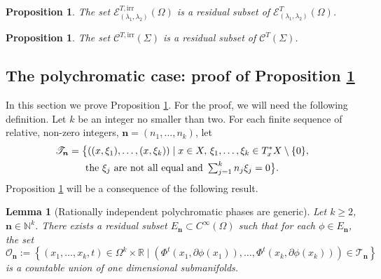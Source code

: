 \documentclass[JEP,XML,SOM,Unicode,published]{cedram}
\let\mathcal\mathscr
\let\sep\mid
\newcommand{\irr}{\mathrm{irr}}
\theoremstyle{plain}
\newtheorem{lemma}[theorem]{Lemma}
\newtheorem{proposition}[theorem]{Proposition}
\theoremstyle{definition}
\newcommand{\N}{\mathbb{N}}
\newcommand{\R}{\mathbb{R}}
\def\calT{\mathcal{T}}
\begin{document}
\begin{proposition}\label{prop:polychrom_conclusion}
The set $\mathcal{E}^{T,\irr}_{(\lambda_1,\lambda_2)}(\Omega)$ is a residual subset of $\mathcal{E}^{T}_{(\lambda_1,\lambda_2)}(\Omega)$.
\end{proposition}

\begin{proposition}\label{prop:monochrom_conclusion}
The set $\mathcal{C}^{T,\irr}(\Sigma)$ is a residual subset of $\mathcal{C}^{T}(\Sigma)$.
\end{proposition}

\subsection{The polychromatic case: proof of Proposition \ref{prop:polychrom_conclusion}}\label{subsec:poly}

In this section we prove Proposition \ref{prop:polychrom_conclusion}. For the proof, we will need the following definition. Let $k$ be an integer no smaller than two. For each finite sequence of relative, non-zero integers, $\boldsymbol{n}=(n_1,\dots,n_k)$, let
\begin{multline*}
\calT_{\boldsymbol{n}}=\bigl{\{}((x,\xi_1),\dots,(x,\xi_k))\sep x\in X,\, \xi_1,\dots,\xi_k\in T^*_xX\setminus\{0\},\\
\text{the $\xi_j$ are not all equal and } \textstyle\sum_{j=1}^kn_j\xi_j=0\bigr{\}}.
\end{multline*}
Proposition \ref{prop:polychrom_conclusion} will be a consequence of the following result.

\begin{lemma}[Rationally independent polychromatic phases are generic]\label{lem:polychrom_irr}
Let $k\geq 2$, $\boldsymbol{n}\in \N^k$.
There exists a residual subset $E_{\boldsymbol{n}}\subset C^\infty(\Omega)$ such that for each $\phi\in E_{\boldsymbol{n}}$,
the set
\[
\mathcal{O}_{\boldsymbol{n}} := \left\{ (x_1,\dots,x_k,t) \in \Omega^k\times \R \sep (\Phi^{t}(x_1,\partial \phi(x_1)), \dots, \Phi^{t}(x_k,\partial \phi(x_k)))\in\calT_{\boldsymbol{n}} \right\}
\]
is a countable union of one dimensional submanifolds.
\end{lemma}
\end{document}
